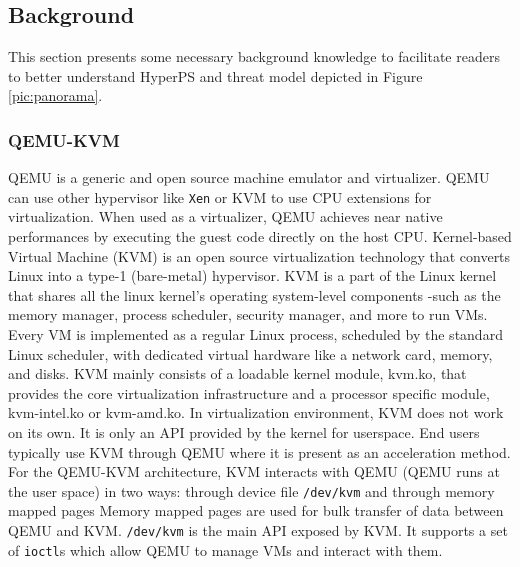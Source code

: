 \subsection{Background}%
\label{sub:background}
This section presents some necessary background knowledge to facilitate readers to better understand HyperPS and threat model depicted in Figure \ref{pic:panorama}.
\subsubsection{QEMU-KVM}%
\label{ssub:qemu_kvm}
QEMU is a generic and open source machine emulator and virtualizer. QEMU can use other hypervisor like \verb|Xen| or KVM to use CPU extensions for virtualization. When used as a virtualizer, QEMU achieves near native performances by executing the guest code directly on the host CPU.
Kernel-based Virtual Machine (KVM) is an open source virtualization technology that converts Linux into a type-1 (bare-metal) hypervisor. KVM is a part of the Linux kernel that shares all the linux kernel's operating system-level components -such as the memory manager, process scheduler, security manager, and more to run VMs. Every VM is implemented as a regular Linux process, scheduled by the standard Linux scheduler, with dedicated virtual hardware like a network card, memory, and disks. KVM mainly consists of a loadable kernel module, kvm.ko, that provides the core virtualization infrastructure and a processor specific module, kvm-intel.ko or kvm-amd.ko.
In virtualization environment, KVM does not work on its own. It is only an API provided by the kernel for userspace. End users typically use KVM through QEMU where it is present as an acceleration method.
For the QEMU-KVM architecture, KVM interacts with QEMU (QEMU runs at the user space) in two ways: through device file \verb|/dev/kvm| and through memory mapped pages
Memory mapped pages are used for bulk transfer of data between QEMU and KVM. \verb|/dev/kvm| is the main API exposed by KVM. It supports a set of \verb|ioctl|s which allow QEMU to manage VMs and interact with them.



